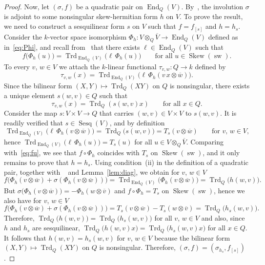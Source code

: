 \documentclass{amsart}
\DeclareMathOperator{\Sesq}{Sesq}
\DeclareMathOperator{\sw}{sw}
\DeclareMathOperator{\End}{End}
\DeclareMathOperator{\Trd}{Trd}
\DeclareMathOperator{\Skew}{Skew}
\theoremstyle{remark}
\begin{document}
\begin{proof}
Now, let $(\sigma,f)$ be a quadratic pair on
$\End_Q(V)$. By~\cite[(4.2)]{BoI}, the involution $\sigma$ is adjoint
to some nonsingular skew-hermitian form $h$ on $V$. 
To prove the result, we need to construct a sesquilinear form $s$ on $V$ such that $f=f_{[s]}$ and $h=h_s$.
Consider the
$k$-vector space isomorphism $\Phi_h\colon V\otimes_Q\overline V \to
\End_Q(V)$ defined as in~\eqref{eq:Phi}, and recall
from~\cite[(5.7)]{BoI} that there exists $\ell\in\End_Q(V)$ such that
\begin{equation}
  \label{eq:fu}
  f\bigl(\Phi_h(u)\bigr) = \Trd_{\End_Q(V)}\bigl(\ell\,\Phi_h(u)\bigr)
  \qquad\text{for all $u\in\Skew(\sw)$.}
\end{equation}
To every $v$, $w\in V$ we attach the $k$-linear functional
$\tau_{v,w}\colon Q\to k$ defined by
\[
  \tau_{v,w}(x) = \Trd_{\End_Q(V)}\bigl(\ell\,\Phi_{h}(v\,x\otimes
  \overline w)\bigr).
\]
Since the bilinear form $(X,Y)\mapsto\Trd_Q(XY)$ on $Q$ is
nonsingular, there exists a unique element $s(w,v)\in Q$ such that
\[
  \tau_{v,w}(x)=\Trd_Q(s(w,v)x)\qquad\text{for all $x\in Q$.}
\]
Consider the map $s\colon V\times V\to Q$ that carries $(w,v)\in
V\times V$ to $s(w,v)$.
It is readily verified that $s\in\Sesq(V)$, and by definition
\[
  \Trd_{\End_Q(V)}\bigl(\ell\,\Phi_h(v\otimes\overline w)\bigr) =
  \Trd_Q\bigl(s(w,v)\bigr)=T_s(v\otimes\overline w) \qquad\text{for
    $v$, $w\in V$,}
\]
hence $\Trd_{\End_Q(V)}\bigl(\ell\,\Phi_h(u)\bigr) = T_s(u)$ for all
$u\in V\otimes_Q\overline V$. 
Comparing with~\eqref{eq:fu}, we see
that $f\circ\Phi_h$ coincides with $T_s$ on $\Skew(\sw)$, and it only remains to prove that $h=h_s$.
Using condition~(ii) in the definition of a quadratic pair, together with ~\cite[(5.1)]{BoI} and Lemma~\ref{lem:diag}, we obtain for $v$, $w\in V$
\[
  f\bigl(\Phi_h(v\otimes\overline w) + \sigma(\Phi_h(v\otimes
  \overline w))\bigr) = \Trd_{\End_Q(V)}\bigl(\Phi_h(v\otimes
  \overline w)\bigr) = \Trd_Q\bigl(h(w,v)\bigr).
\]
But $\sigma\bigl(\Phi_h(v\otimes\overline w)\bigr) =
-\Phi_h(w\otimes\overline v)$ and $f\circ\Phi_h = T_s$ on
$\Skew(\sw)$, hence we also have for $v$, $w\in V$
\[
  f\bigl(\Phi_h(v\otimes\overline w) + \sigma(\Phi_h(v\otimes
  \overline w))\bigr) = T_s(v\otimes\overline w) -
  T_s(w\otimes\overline v) = \Trd_Q\bigl(h_s(w,v)\bigr).
\]
Therefore, $\Trd_Q\bigl(h(w,v)\bigr) = \Trd_Q\bigl(h_s(w,v)\bigr)$ for
all $v$, $w\in V$ and also, since $h$ and $h_s$ are sesquilinear,
$\Trd_Q\bigl(h(w,v)x\bigr) = \Trd_Q\bigl(h_s(w,v)x\bigr)$ for all
$x\in Q$. It follows that $h(w,v)=h_s(w,v)$ for $v$, $w\in V$ because
the bilinear form $(X,Y)\mapsto \Trd_Q(XY)$ on $Q$ is
nonsingular. Therefore, $(\sigma,f)=(\sigma_{h_s},f_{[s]})$.


\end{proof}
\end{document}
